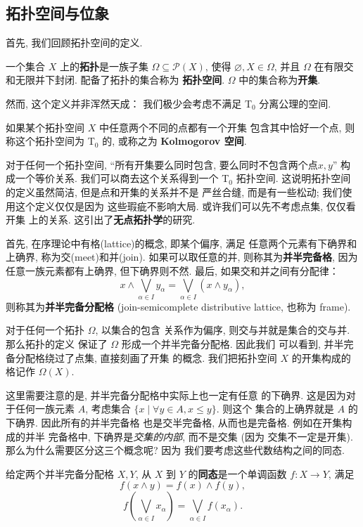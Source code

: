 \subsection{拓扑空间与位象}
首先, 我们回顾拓扑空间的定义.
\begin{definition}
一个集合 \(X\) 上的\textbf{拓扑}是一族子集 \(\Omega \subseteq \mathcal P(X)\),
使得 \(\varnothing, X \in \Omega\), 并且
\(\Omega\) 在有限交和无限并下封闭. 配备了拓扑的集合称为%
\textbf{拓扑空间}. \(\Omega\) 中的集合称为\textbf{开集}.
\end{definition}
然而, 这个定义并非浑然天成： 我们极少会考虑不满足 T\(_0\)
分离公理的空间.
\begin{definition}
如果某个拓扑空间 \(X\) 中任意两个不同的点都有一个开集
包含其中恰好一个点, 则称这个拓扑空间为 T\(_0\) 的,
或称之为 \textbf{Kolmogorov 空间}.
\end{definition}
对于任何一个拓扑空间, “所有开集要么同时包含, 要么同时不包含两个点\(x,y\)”
构成一个等价关系. 我们可以商去这个关系得到一个 T\(_0\) 拓扑空间.
这说明拓扑空间的定义虽然简洁, 但是点和开集的关系并不是
严丝合缝, 而是有一些松动; 我们使用这个定义仅仅是因为
这些瑕疵不影响大局. 或许我们可以先不考虑点集, 仅仅看开集
上的关系. 这引出了\textbf{无点拓扑学}的研究.

首先, 在序理论中有格(lattice)的概念, 即某个偏序, 满足
任意两个元素有下确界和上确界, 称为交(meet)和并(join).
如果可以取任意的并, 则称其为\textbf{并半完备格},
因为任意一族元素都有上确界, 但下确界则不然.
最后, 如果交和并之间有分配律：
\[x \wedge \bigvee_{\alpha \in I} y_\alpha
= \bigvee_{\alpha \in I} (x \wedge y_\alpha),\]
则称其为\textbf{并半完备分配格} (join-semicomplete distributive lattice,
也称为 frame).

对于任何一个拓扑 \(\Omega\), 以集合的包含
关系作为偏序, 则交与并就是集合的交与并. 那么拓扑的定义
保证了 \(\Omega\) 形成一个并半完备分配格. 因此我们
可以看到, 并半完备分配格绕过了点集, 直接刻画了开集
的概念. 我们把拓扑空间 \(X\) 的开集构成的格记作 \(\Omega(X)\).

这里需要注意的是, 并半完备分配格中实际上也一定有任意
的下确界. 这是因为对于任何一族元素 \(A\), 考虑集合
\(\{x \mid \forall y \in A, x \le y\}\). 则这个
集合的上确界就是 \(A\) 的下确界. 因此所有的并半完备格
也是交半完备格, 从而也是完备格. 例如在开集构成的并半
完备格中, 下确界是\emph{交集的内部}, 而不是交集 (因为
交集不一定是开集). 那么为什么需要区分这三个概念呢? 因为
我们要考虑这些代数结构之间的同态.

\begin{definition}
给定两个并半完备分配格 \(X, Y\), 从 \(X\) 到 \(Y\)
的\textbf{同态}是一个单调函数 \(f : X \to Y\), 满足
\[f(x\wedge y) = f(x) \wedge f(y),\]
\[f\left(\bigvee_{\alpha \in I} x_\alpha\right)
= \bigvee_{\alpha \in I} f(x_\alpha).\]
\end{definition}

